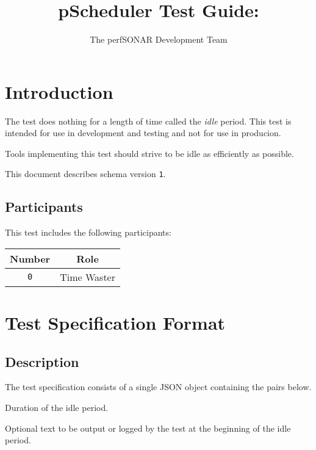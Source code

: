 \documentclass[10pt]{article}
\title{pScheduler Test Guide: {\it \testname}}
\author{The perfSONAR Development Team}
\begin{document}
\maketitle


%
%

\section{Introduction}

The {\tt \testname} test does nothing for a length of time called the
{\it idle} period.  This test is intended for use in development and
testing and not for use in producion.

Tools implementing this test should strive to be idle as efficiently
as possible.

This document describes schema version {\tt 1}.

\subsection{Participants}

This test includes the following participants:

\begin{center}
\begin{tabular}{|c|c|}
\hline
{\bf Number} & {\bf Role} \\
\hline
{\tt 0} & Time Waster \\
\hline
\end{tabular}
\end{center}



%
%

\section{Test Specification Format}

\subsection{Description}

The test specification consists of a single JSON object containing the
pairs below.  \seejson


 Duration of the idle period.

 Optional text to be output or
logged by the test at the beginning of the idle period.
\end{document}
